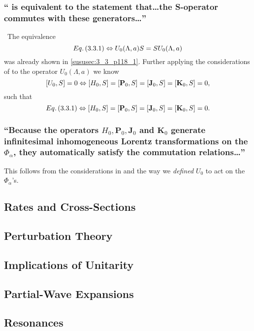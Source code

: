 \subsubsection{\enquote{ is equivalent to the statement that\dots the S-operator commutes with these generators\dots}}\,\newline
{}
The equivalence \[Eq.\,({3.3.1})\Leftrightarrow U_0(\Lambda, a)S=S U_0(\Lambda, a)\]
was already shown in \ref{sususec:3_3_p118_1}. Further applying the considerations of  to the operator $U_0(\Lambda, a)$ we know
\[\commutator{U_0}{S}=0\Leftrightarrow \commutator{H_0}{S}=\commutator{\textbf{P}_0}{S}=\commutator{\textbf{J}_0}{S}=\commutator{\textbf{K}_0}{S}=0,\]
such that
\[\eq{3.3.1}\Leftrightarrow \commutator{H_0}{S}=\commutator{\textbf{P}_0}{S}=\commutator{\textbf{J}_0}{S}=\commutator{\textbf{K}_0}{S}=0.\]

\subsubsection{\enquote{Because the operators $H_0,\textbf{P}_0, \textbf{J}_0$ and $\textbf{K}_0$ generate infinitesimal inhomogeneous Lorentz transformations on the $\Phi_\alpha$, they automatically satisfy the commutation relations\dots}}
This follows from the considerations in  and the way we \emph{defined} $U_0$ to act on the $\Phi_\alpha$'s.




\subsection{Rates and Cross-Sections}\label{susec:3_4}



\subsection{Perturbation Theory}\label{susec:3_5}



\subsection{Implications of Unitarity}\label{susec:3_6}



\subsection{Partial-Wave Expansions}\label{susec:3_7}



\subsection{Resonances}\label{susec:3_8}

